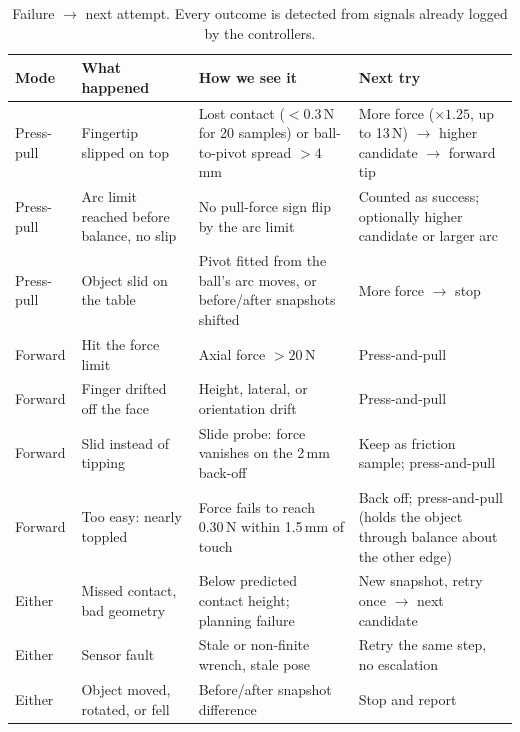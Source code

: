 \documentclass[10pt, conference]{IEEEtran}
\begin{document}
\begin{table}[t]
  \centering
  \caption{Failure $\rightarrow$ next attempt. Every outcome is detected from signals already logged by the controllers.}
  \label{tab:cascade}
  \small
  \begin{tabular}{p{} p{} p{} p{}}
    \toprule
    \textbf{Mode} & \textbf{What happened} & \textbf{How we see it} & \textbf{Next try} \\
    \midrule
    Press-pull & Fingertip slipped on top & Lost contact ($<0.3$\,N for 20 samples) or ball-to-pivot spread $>4$\,mm & More force ($\times1.25$, up to 13\,N) $\rightarrow$ higher candidate $\rightarrow$ forward tip \\
    Press-pull & Arc limit reached before balance, no slip & No pull-force sign flip by the arc limit & Counted as success; optionally higher candidate or larger arc \\
    Press-pull & Object slid on the table & Pivot fitted from the ball's arc moves, or before/after snapshots shifted & More force $\rightarrow$ stop \\
    Forward & Hit the force limit & Axial force $>20$\,N & Press-and-pull \\
    Forward & Finger drifted off the face & Height, lateral, or orientation drift & Press-and-pull \\
    Forward & Slid instead of tipping & Slide probe: force vanishes on the 2\,mm back-off & Keep as friction sample; press-and-pull \\
    Forward & Too easy: nearly toppled & Force fails to reach 0.30\,N within 1.5\,mm of touch & Back off; press-and-pull (holds the object through balance about the other edge) \\
    Either & Missed contact, bad geometry & Below predicted contact height; planning failure & New snapshot, retry once $\rightarrow$ next candidate \\
    Either & Sensor fault & Stale or non-finite wrench, stale pose & Retry the same step, no escalation \\
    Either & Object moved, rotated, or fell & Before/after snapshot difference & Stop and report \\
    \bottomrule
  \end{tabular}
\end{table}
\end{document}
